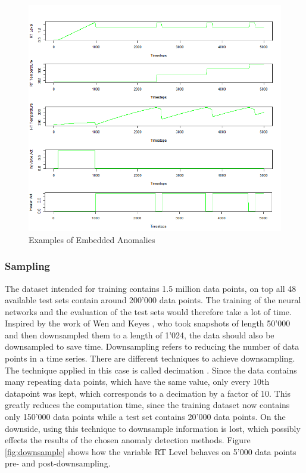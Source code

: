 \begin{figure}[h]
	\centering
	\includegraphics[scale=0.6]{Figures/GHL_data}
	\decoRule
	\caption[Most important var]{Examples of Embedded Anomalies \parencite{Own}}
	\label{fig:GHL_data}
\end{figure}

\subsubsection{Sampling}
The dataset intended for training contains 1.5 million data points, on top all 48 available test sets contain around 200'000 data points. The training of the neural networks and the evaluation of the test sets would therefore take a lot of time. Inspired by the work of Wen and Keyes \parencite*{Wen2019}, who took snapshots of length 50'000 and then downsampled them to a length of 1'024, the data should also be downsampled to save time. Downsampling  refers to reducing the number of data points in a time series. There are different techniques to achieve downsampling. The technique applied in this case is called decimation \parencite{Tan2018}. Since the data contains many repeating data points, which have the same value, only every 10th datapoint was kept, which corresponds to a decimation by a factor of 10. This greatly reduces the computation time, since the training dataset now contains only 150'000 data points while a test set contains 20'000 data points. On the downside, using this technique to downsample information is lost, which possibly effects the results of the chosen anomaly detection methods. Figure \ref{fig:downsample} shows how the variable RT Level behaves on 5'000 data points pre- and post-downsampling.

